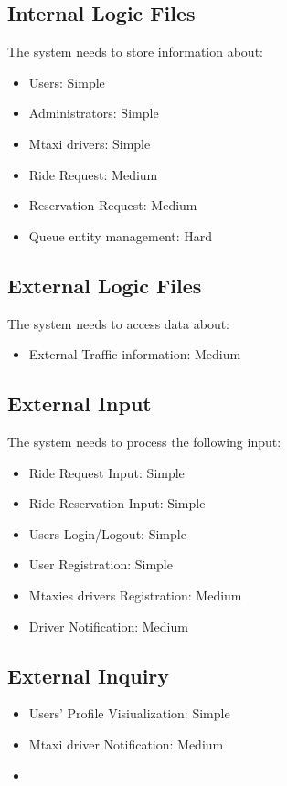 \documentclass[11pt,titlepage]{article} %
\begin{document}
  \subsection{Internal Logic Files}
    The system needs to store information about:
    \begin{itemize}
     \item Users: Simple
     \item Administrators: Simple
     \item Mtaxi drivers: Simple
     \item Ride Request: Medium
     \item Reservation Request: Medium
     \item Queue entity management: Hard
    \end{itemize}
    
   \subsection{External Logic Files}
    The system needs to access data about:
    \begin{itemize}
     \item External Traffic information: Medium
    \end{itemize}
    
    \subsection{External Input}
     The system needs to process the following input:
     \begin{itemize}
      \item Ride Request Input: Simple
      \item Ride Reservation Input: Simple
      \item Users Login/Logout: Simple
      \item User Registration: Simple
      \item Mtaxies drivers Registration: Medium
      \item Driver Notification: Medium
     \end{itemize}
    
    \subsection{External Inquiry}
      \begin{itemize}
       \item Users' Profile Visiualization: Simple
       \item Mtaxi driver Notification: Medium
       \item 
      \end{itemize}
   
\end{document}
